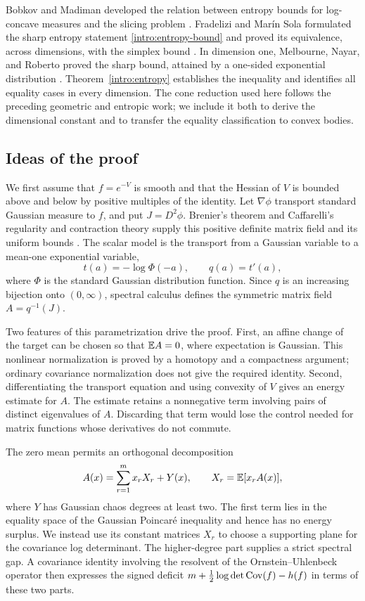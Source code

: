 Bobkov and Madiman developed the relation between entropy bounds for
log-concave measures and the slicing problem \cite{BobkovMadiman2011}.
Fradelizi and Mar\'in Sola formulated the sharp entropy statement
\eqref{intro:entropy-bound} and proved its equivalence, across dimensions,
with the simplex bound \cite[Conjecture~3(iii) and Proposition~5.2]{FradeliziMarinSola2026}.
In dimension one, Melbourne, Nayar, and Roberto proved the sharp bound,
attained by a one-sided exponential distribution
\cite[Theorem~1.1]{MelbourneNayarRoberto2026}.
Theorem~\ref{intro:entropy} establishes the inequality and identifies
all equality cases in every dimension.
The cone reduction used here follows the preceding geometric and
entropic work; we include it both to derive the dimensional constant
and to transfer the equality classification to convex bodies.

\subsection{Ideas of the proof}

We first assume that $f=e^{-V}$ is smooth and that the Hessian of $V$ is
bounded above and below by positive multiples of the identity.
Let $\nabla\phi$ transport standard Gaussian measure to $f$, and put
$J=D^2\phi$.  Brenier's theorem and Caffarelli's regularity and
contraction theory supply this positive definite matrix field and its
uniform bounds
\cite{Brenier1991,McCann1995,Caffarelli2000,CorderoErausquinFigalli2019}.
The scalar model is the transport from a Gaussian variable to a
mean-one exponential variable,
\[
 t(a)=-\log\Phi(-a),\qquad q(a)=t'(a),
\]
where $\Phi$ is the standard Gaussian distribution function.  Since $q$
is an increasing bijection onto $(0,\infty)$, spectral calculus defines
the symmetric matrix field $A=q^{-1}(J)$.

Two features of this parametrization drive the proof.  First, an affine
change of the target can be chosen so that $\mathbb E A=0$, where expectation
is Gaussian.  This nonlinear normalization is proved by a homotopy and
a compactness argument; ordinary covariance normalization does not
give the required identity.  Second, differentiating the transport
equation and using convexity of $V$ gives an energy estimate for $A$.
The estimate retains a nonnegative term involving pairs of distinct
eigenvalues of $A$.  Discarding that term would lose the control needed
for matrix functions whose derivatives do not commute.

The zero mean permits an orthogonal decomposition
\[
 A(x)=\sum_{r=1}^m x_rX_r+Y(x),
 \qquad X_r=\mathbb E[x_rA(x)],
\]
where $Y$ has Gaussian chaos degrees at least two.  The first term lies
in the equality space of the Gaussian Poincar\'e inequality and hence
has no energy surplus.  We instead use its constant matrices $X_r$ to
choose a supporting plane for the covariance log determinant.
The higher-degree part supplies a strict spectral gap.  A covariance
identity involving the resolvent of the Ornstein--Uhlenbeck operator
then expresses the signed deficit
$m+\tfrac12\log\det\operatorname{Cov}(f)-h(f)$ in terms of these two parts.

